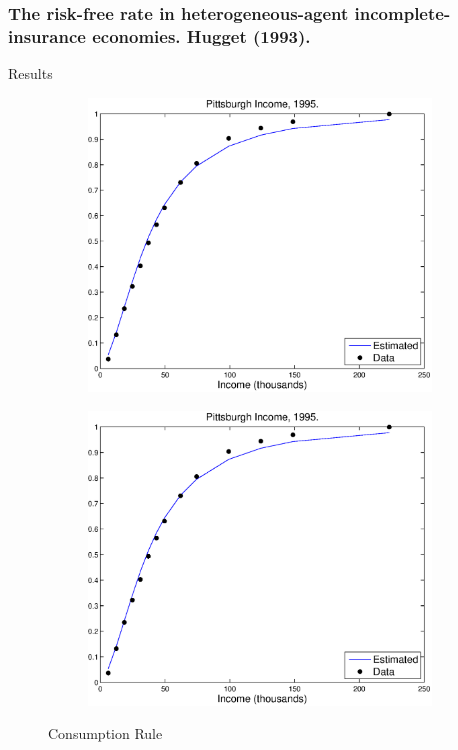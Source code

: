 \documentclass{beamer}
\begin{document}
\frame
{
  \frametitle{ The risk-free rate in heterogeneous-agent incomplete-insurance economies. Hugget (1993).}
Results 
\begin{figure}
        \begin{subfigure}[b]{0.5\textwidth}
                \includegraphics[width=\textwidth]{GLN4Fy.eps}
        \end{subfigure}%
        \begin{subfigure}[b]{0.5\textwidth}
                \includegraphics[width=\textwidth]{GLN4Fy.eps}
        \end{subfigure}
        \caption{Consumption Rule}
\end{figure}
}
\end{document}
